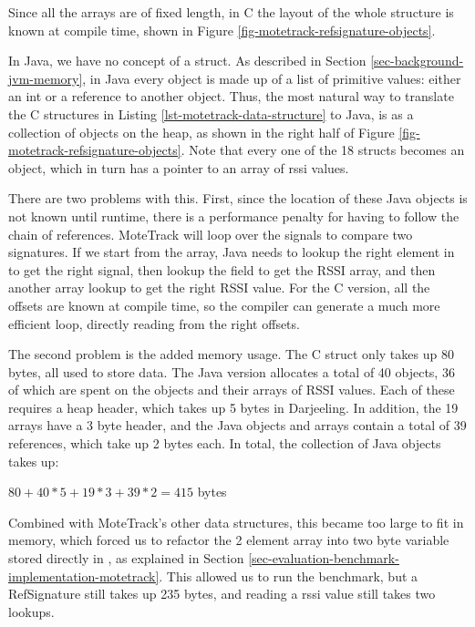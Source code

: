 Since all the arrays are of fixed length, in C the layout of the whole structure is known at compile time, shown in Figure \ref{fig-motetrack-refsignature-objects}.

In Java, we have no concept of a struct. As described in Section \ref{sec-background-jvm-memory}, in Java every object is made up of a list of primitive values: either an int or a reference to another object. Thus, the most natural way to translate the C structures in Listing \ref{lst-motetrack-data-structure} to Java, is as a collection of objects on the heap, as shown in the right half of Figure \ref{fig-motetrack-refsignature-objects}. Note that every one of the 18  structs becomes an object, which in turn has a pointer to an array of rssi values.

There are two problems with this. First, since the location of these Java objects is not known until runtime, there is a performance penalty for having to follow the chain of references. MoteTrack will loop over the signals to compare two signatures. If we start from the  array, Java needs to lookup the right element in  to get the right signal, then lookup the  field to get the RSSI array, and then another array lookup to get the right RSSI value. For the C version, all the offsets are known at compile time, so the compiler can generate a much more efficient loop, directly reading from the right offsets.

The second problem is the added memory usage. The C struct only takes up 80 bytes, all used to store data. The Java version allocates a total of 40 objects, 36 of which are spent on the  objects and their arrays of RSSI values. Each of these requires a heap header, which takes up 5 bytes in Darjeeling. In addition, the 19 arrays have a 3 byte header, and the Java objects and arrays contain a total of 39 references, which take up 2 bytes each. In total, the collection of Java objects takes up:

$80 + 40*5 + 19*3 + 39*2 = 415$ bytes

Combined with MoteTrack's other data structures, this became too large to fit in memory, which forced us to refactor the 2 element  array into two byte variable stored directly in , as explained in Section \ref{sec-evaluation-benchmark-implementation-motetrack}. This allowed us to run the benchmark, but a RefSignature still takes up 235 bytes, and reading a rssi value still takes two lookups.

